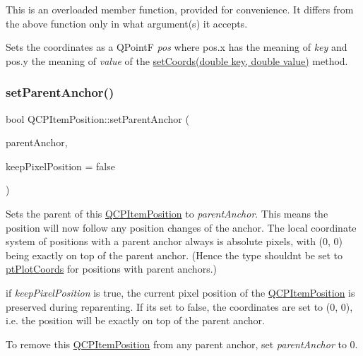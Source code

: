 This is an overloaded member function, provided for convenience. It differs from the above function only in what argument(s) it accepts.

Sets the coordinates as a Q\+PointF {\itshape pos} where pos.\+x has the meaning of {\itshape key} and pos.\+y the meaning of {\itshape value} of the \hyperlink{class_q_c_p_item_position_aa988ba4e87ab684c9021017dcaba945f}{set\+Coords(double key, double value)} method. \mbox{\label{class_q_c_p_item_position_ac094d67a95d2dceafa0d50b9db3a7e51}} 
\subsubsection{\texorpdfstring{set\+Parent\+Anchor()}{setParentAnchor()}}
{\footnotesize\ttfamily bool Q\+C\+P\+Item\+Position\+::set\+Parent\+Anchor (\begin{DoxyParamCaption}\item[{\hyperlink{class_q_c_p_item_anchor}{Q\+C\+P\+Item\+Anchor} $\ast$}]{parent\+Anchor,  }\item[{bool}]{keep\+Pixel\+Position = {\ttfamily false} }\end{DoxyParamCaption})}

Sets the parent of this \hyperlink{class_q_c_p_item_position}{Q\+C\+P\+Item\+Position} to {\itshape parent\+Anchor}. This means the position will now follow any position changes of the anchor. The local coordinate system of positions with a parent anchor always is absolute pixels, with (0, 0) being exactly on top of the parent anchor. (Hence the type shouldn\textquotesingle{}t be set to \hyperlink{class_q_c_p_item_position_aad9936c22bf43e3d358552f6e86dbdc8ad5ffb8dc99ad73263f7010c77342294c}{pt\+Plot\+Coords} for positions with parent anchors.)

if {\itshape keep\+Pixel\+Position} is true, the current pixel position of the \hyperlink{class_q_c_p_item_position}{Q\+C\+P\+Item\+Position} is preserved during reparenting. If it\textquotesingle{}s set to false, the coordinates are set to (0, 0), i.\+e. the position will be exactly on top of the parent anchor.

To remove this \hyperlink{class_q_c_p_item_position}{Q\+C\+P\+Item\+Position} from any parent anchor, set {\itshape parent\+Anchor} to 0.

